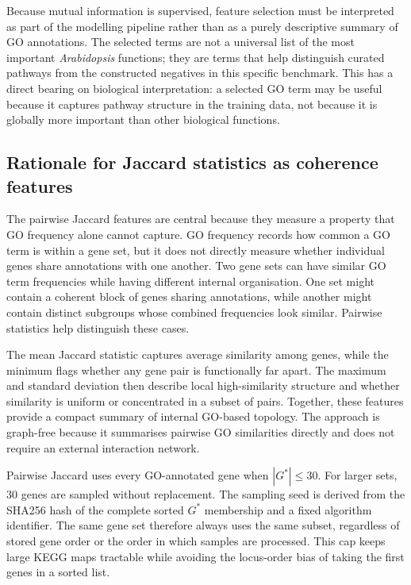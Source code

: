 \documentclass[12pt,twoside]{article}
\begin{document}
Because mutual information is supervised, feature selection must be interpreted as part of the modelling pipeline rather than as a purely descriptive summary of GO annotations. The selected terms are not a universal list of the most important \textit{Arabidopsis} functions; they are terms that help distinguish curated pathways from the constructed negatives in this specific benchmark. This has a direct bearing on biological interpretation: a selected GO term may be useful because it captures pathway structure in the training data, not because it is globally more important than other biological functions.

\subsection{Rationale for Jaccard statistics as coherence features}
\label{sec:methods_jaccard_rationale}

The pairwise Jaccard features are central because they measure a property that GO frequency alone cannot capture. GO frequency records how common a GO term is within a gene set, but it does not directly measure whether individual genes share annotations with one another. Two gene sets can have similar GO term frequencies while having different internal organisation. One set might contain a coherent block of genes sharing annotations, while another might contain distinct subgroups whose combined frequencies look similar. Pairwise statistics help distinguish these cases.

The mean Jaccard statistic captures average similarity among genes, while the minimum flags whether any gene pair is functionally far apart. The maximum and standard deviation then describe local high-similarity structure and whether similarity is uniform or concentrated in a subset of pairs. Together, these features provide a compact summary of internal GO-based topology. The approach is graph-free because it summarises pairwise GO similarities directly and does not require an external interaction network.

Pairwise Jaccard uses every GO-annotated gene when $|G^*|\leq30$. For larger sets, 30 genes are sampled without replacement. The sampling seed is derived from the SHA256 hash of the complete sorted $G^*$ membership and a fixed algorithm identifier. The same gene set therefore always uses the same subset, regardless of stored gene order or the order in which samples are processed. This cap keeps large KEGG maps tractable while avoiding the locus-order bias of taking the first genes in a sorted list.
\end{document}
